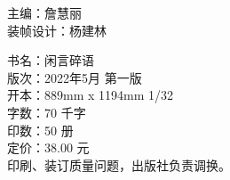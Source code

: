 \documentclass[twoside]{ctexbook}
\begin{document}


% 
\thispagestyle{empty}


\clearpage

\thispagestyle{empty}
\vspace*{\fill}

\begin{flushleft}
  \begingroup

  主\hspace*{2\ccwd}编：詹慧丽\\
  装帧设计：杨建林\\
  \endgroup
\end{flushleft}
\vspace{3em}
\begin{flushleft}

  \begingroup

  书\hspace*{2\ccwd}名：闲言碎语\\
  版\hspace*{2\ccwd}次：2022年5月 第一版\\
  开\hspace*{2\ccwd}本：889mm x 1194mm  1/32\\
  字\hspace*{2\ccwd}数：70 千字\\
  印\hspace*{2\ccwd}数：50 册\\
  定\hspace*{2\ccwd}价：38.00 元\\
  \vspace{2em}
  印刷、装订质量问题，出版社负责调换。
  \endgroup
\end{flushleft}

\clearpage

\thispagestyle{empty}

\vspace*{3em}
\hspace{3em}
\newpage
\thispagestyle{empty}
\
\newpage
\setcounter{page}{1}
\heiti{\tableofcontents}
\thispagestyle{empty}

\songti
\mainmatter
\hypersetup{pageanchor=true}




% 
\end{document}
